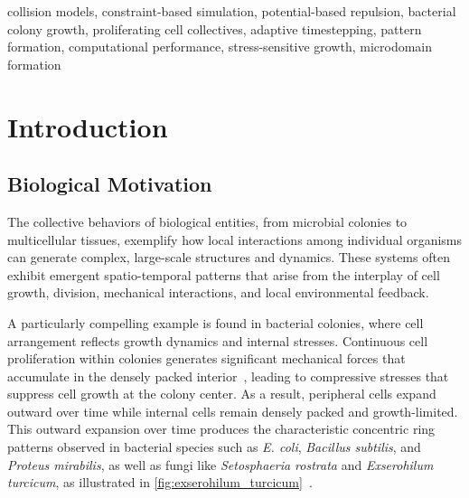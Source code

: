 \documentclass[conference]{IEEEtran}
\begin{document}
\begin{IEEEkeywords}
    collision models, constraint-based simulation, potential-based repulsion, bacterial colony growth, proliferating cell collectives, adaptive timestepping, pattern formation, computational performance, stress-sensitive growth, microdomain formation
\end{IEEEkeywords}

\section{Introduction}
\subsection{Biological Motivation}

The collective behaviors of biological entities, from microbial colonies to multicellular tissues, exemplify how local interactions among individual organisms can generate complex, large-scale structures and dynamics. These systems often exhibit emergent spatio-temporal patterns that arise from the interplay of cell growth, division, mechanical interactions, and local environmental feedback.

A particularly compelling example is found in bacterial colonies, where cell arrangement reflects growth dynamics and internal stresses. Continuous cell proliferation within colonies generates significant mechanical forces that accumulate in the densely packed interior~\cite{Wittmann2023}, leading to compressive stresses that suppress cell growth at the colony center. As a result, peripheral cells expand outward over time while internal cells remain densely packed and growth-limited. This outward expansion over time produces the characteristic concentric ring patterns observed in bacterial species such as \textit{E. coli}, \textit{Bacillus subtilis}, and \textit{Proteus mirabilis}, as well as fungi like \textit{Setosphaeria rostrata} and \textit{Exserohilum turcicum}, as illustrated in \autoref{fig:exserohilum_turcicum}~\cite{YAMAZAKI2005136}.
\end{document}
